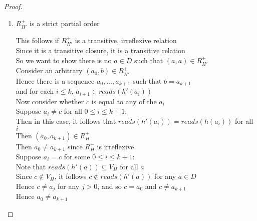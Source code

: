 \begin{proof}
\begin{enumerate}
\item $R^+_{H'}$ is a strict partial order 
  \begin{tabbedproof}
    \oo This follows if $R^+_{H'}$ is a transitive, irreflexive relation \\
    \oo Since it is a transitive closure, it is a transitive relation \\
    \oo So we want to show there is no $a \in D$ such that $(a,a) \in R^+_{H'}$ \\
    \oo Consider an arbitrary $(a_0, b) \in R^+_{H'}$ \\
    \oo Hence there is a sequence $a_0, \ldots, a_{k+1}$ such that $b = a_{k+1}$ \\
    \ox and for each $i \leq k$, $a_{i+1} \in \mathit{reads}(h'(a_i))$ \\
    \oo Now consider whether $c$ is equal to any of the $a_i$ \\
    \oo Suppose $a_i \not= c$ for all $0 \leq i \leq k+1$: \\
    \ooo Then in this case, it follows that $\mathit{reads}(h'(a_i)) = \mathit{reads}(h(a_i))$ for all $i$\\
    \ooo Then $(a_0, a_{k+1}) \in R^+_H$ \\
    \ooo Then $a_0 \not= a_{k+1}$ since $R^+_H$ is irreflexive \\
    \oo Suppose $a_i = c$ for some $0 \leq i \leq k+1$: \\
    \ooo Note that $\mathit{reads}(h'(a)) \subseteq V_H$ for all $a$  \\
    \ooo Since $c \not\in V_H$, it follows $c \not\in \mathit{reads}(h'(a))$ for any $a \in D$ \\
    \ooo Hence $c \not= a_j$ for any $j > 0$, and so $c = a_0$ and $c \not= a_{k+1}$\\
    \ooo Hence $a_0 \not= a_{k+1}$
  \end{tabbedproof}


\end{enumerate}
\end{proof}
